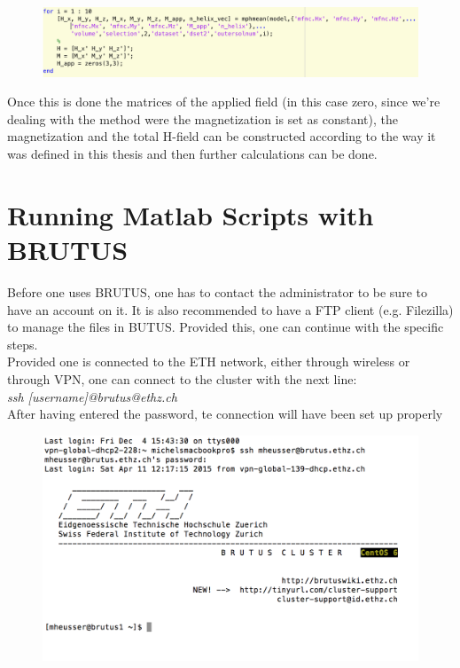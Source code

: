 \begin{figure}[H]
	\centering
  \includegraphics[width=\textwidth]{Pictures/Screenshots/Sim34.png}
\end{figure} 

Once this is done the matrices of the applied field (in this case zero, since we're dealing with the method were the magnetization is set as constant), the magnetization and the total H-field can be constructed according to the way it was defined in this thesis and then further calculations can be done. 

\section{Running Matlab Scripts with BRUTUS}

Before one uses BRUTUS, one has to contact the administrator to be sure to have an account on it. It is also recommended to have a FTP client (e.g. Filezilla) to manage the files in BUTUS. Provided this, one can continue with the specific steps.\\

Provided one is connected to the ETH network, either through wireless or through VPN, one can connect to the cluster with the next line:\\

\textit{ssh [username]@brutus@ethz.ch}\\

After having entered the password, te connection will have been set up properly

\begin{figure}[H]
	\centering
  \includegraphics[width=\textwidth]{Pictures/Screenshots/Sim35.png}
\end{figure} 

